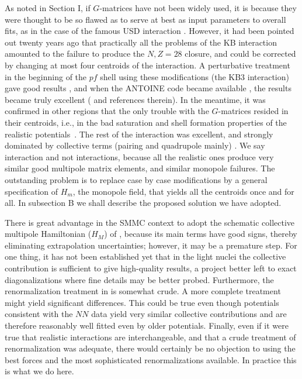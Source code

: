 \begin{multicols}{2}
As noted in Section I, if $G$-matrices have not been widely used, it
is because they were thought to be so flawed as to serve at best as
input parameters to overall fits, as in the
case of the famous USD interaction
\cite{r:wildenthal}. However, it had been pointed out twenty years ago
\cite{pasquini} that practically all the problems of the KB
interaction amounted to the failure to produce the $N,Z=28$ closure,
and could be corrected by changing at most four centroids of the
interaction. A
perturbative treatment in the beginning of the $pf$ shell using these
modifications (the KB3 interaction) gave good results \cite{PZ81a},
and when the ANTOINE code became available \cite{r:antoine}, the
results became truly excellent (\cite{4749,phila} and references
therein). In the meantime, it was confirmed in other regions that
the only trouble with the $G$-matrices resided in their centroids,
i.e., in the bad saturation and shell formation properties of the
realistic potentials~\cite{acz}. The rest of the interaction was
excellent, and strongly dominated by collective terms (pairing and
quadrupole mainly) \cite{mdz}. We say interaction and not
interactions, because all the realistic ones produce very similar good
multipole matrix elements, and similar monopole failures. The
outstanding problem is to replace case by case modifications by a
general specification of $H_m$, the monopole field, that yields
all the centroids once and for all. In subsection B we shall describe
the proposed solution \cite{dz98} we have adopted.

There is great advantage in the SMMC context to adopt the schematic
collective multipole Hamiltonian ($H_M$) of \cite{mdz}, because its
main terms have good signs, thereby eliminating extrapolation
uncertainties; however, it may be a premature step.
For one thing, it has not been
established yet that in the light nuclei the collective contribution
is sufficient to give high-quality results, a project better left to
exact diagonalizations where fine details may be better probed.
Furthermore,
the renormalization treatment in \cite{mdz} is somewhat crude. A
more complete treatment might yield significant differences. This
could be true even though
potentials consistent with the $NN$ data yield very
similar collective contributions and are
therefore reasonably well fitted even by older potentials.  Finally,
even if it were true that realistic interactions are interchangeable,
and that a crude treatment of renormalization was adequate, there
would certainly be no objection to using the best forces and the most
sophisticated renormalizations available. In practice this is what we do
here.


\end{multicols}
